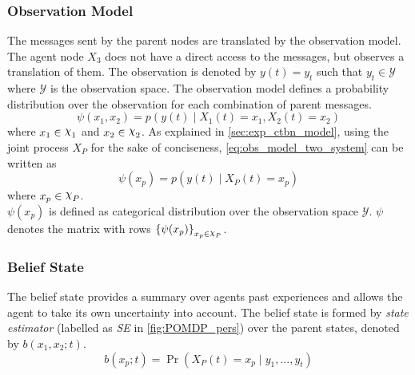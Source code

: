 \subsubsection{Observation Model}
The messages sent by the parent nodes are translated by the observation model. The agent node $ X_3 $ does not have a direct access to the messages, but observes a translation of them. The observation is denoted by $ y(t) = y_t $ such that $ y_t \in \mathcal{Y} $ where $ \mathcal{Y} $ is the observation space. The observation model defines a probability distribution over the observation for each combination of parent messages.
\begin{equation}
\psi(x_1, x_2) = p(y(t) \mid X_{1}(t)=x_1, X_{2}(t)=x_2)
\label{eq:obs_model_two_system}
\end{equation}
where $ x_1 \in \rchi_1 $ and $ x_2 \in \rchi_2 $. As explained in \cref{sec:exp_ctbn_model}, using the joint process $ X_P $ for the sake of conciseness, \autoref{eq:obs_model_two_system} can be written as
\begin{equation}
\psi(x_p) = p(y(t) \mid X_P(t)=x_p)
\label{eq:obs_model_p}
\end{equation}
where $ x_p \in \rchi_P $. \\
$ \psi(x_p) $ is defined as categorical distribution over the observation space $ \mathcal{Y} $. $ \psi $ denotes the matrix with rows $ \left\lbrace \psi(x_p)\right\rbrace_{x_p \in \rchi_P} $.
\subsubsection{Belief State}
The belief state provides a summary over agents past experiences and allows the agent to take its own uncertainty into account. The belief state is formed by \textit{state estimator} (labelled as \textit{SE} in \cref{fig:POMDP_pers}) over the parent states, denoted by $  b(x_{1}, x_{2}; t) $. 
\begin{equation}
b(x_p; t) = \operatorname{Pr}( X_P(t) = x_p \mid y_{1}, ..., y_{t})
\end{equation}
